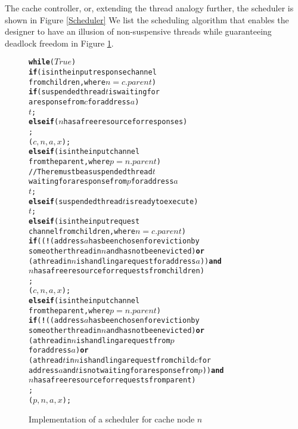 The cache controller, or, extending the thread analogy further, the scheduler
is shown in Figure \ref{Scheduler} We list the scheduling algorithm that
enables the designer to have an illusion of non-suspensive threads while
guaranteeing deadlock freedom in Figure \ref{scheduler}.

\newcommand{\lWhile}{\textbf{while}}
\newcommand{\lIf}{\textbf{if}}
\newcommand{\lElsIf}{\textbf{else if}}
\newcommand{\lElse}{\textbf{else}}

\begin{figure}
\small
\begin{alltt}
\normalfont
\lWhile{} (\(True\)) \bopen
      \lIf ( is in the input response channel
             from children, where \(n = c.parent\)) \bopen
            \lIf (suspended thread \(t\) is waiting for 
                  a response from \(c\) for address \(a\)) \bopen
                   \resume{} \(t\);
            \bclose \lElsIf ($n$ has a free resource for responses) \bopen
                   \receive{} ;
                   \start{} \dRespL(\(c, n, a, x\));
            \bclose
      \bclose \lElsIf ( is in the input channel
                       from the parent, where \(p = n.parent\)) \bopen
                   // There must be a suspended thread \(t\)
                   waiting for a response from \(p\) for address \(a\)
                   \resume{} \(t\);
            \bclose
      \bclose \lElsIf (suspended thread \(t\) is ready to execute)
             \resume{} \(t\);
      \bclose \lElsIf ( is in the input request
                      channel from children, where \(n = c.parent\)) \bopen
             \lIf ((\textbf{!}(address \(a\) has been chosen for eviction by 
                       some other thread in \(n\) and has not been evicted) \textbf{or}
                     (a thread in \(n\) is handling a request for address \(a\))) \textbf{and}
                    \(n\) has a free resource for requests from children) \bopen
                   \receive{} ;
                   \start{} \uReq(\(c, n, a, x\));
             \bclose
      \bclose \lElsIf ( is in the input channel
                        from the parent, where \(p = n.parent\)) \bopen
             \lIf (\textbf{!}((address \(a\) has been chosen for eviction by 
                       some other thread in \(n\) and has not been evicted) \textbf{or}
                     (a thread in \(n\) is handling a request from \(p\)
                       for address \(a\)) \textbf{or}
                     (a thread \(t\) in \(n\) is handling a request from child \(c\) for
                       address \(a\) and \(t\) is not waiting for a response from \(p\))) \textbf{and}
                    \(n\) has a free resource for requests from parent) \bopen
                   \receive{} ;
                   \start{} \dReq(\(p, n, a, x\));
             \bclose
      \bclose
\bclose
\end{alltt}
\caption{Implementation of a scheduler for cache node $n$}
\label{scheduler}
\end{figure}

